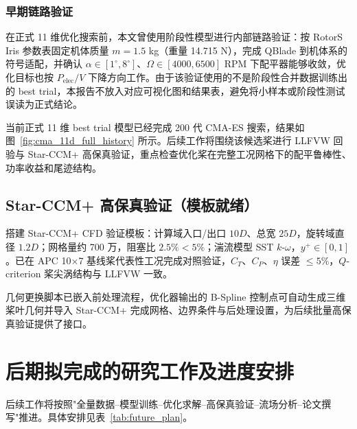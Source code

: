 \subsubsection{早期链路验证}

在正式 11 维优化搜索前，本文曾使用阶段性模型进行内部链路验证：按 RotorS Iris 参数表固定机体质量 $m=1.5$ kg（重量 14.715 N），完成 QBlade 到机体系的符号适配，并确认 $\alpha \in [1^\circ,8^\circ]$、$\Omega \in [4000,6500]$ RPM 下配平器能够收敛，优化目标也按 $P_\text{elec}/V$ 下降方向工作。由于该验证使用的不是阶段性合并数据训练出的 best trial，本报告不放入对应可视化图和结果表，避免将小样本或阶段性测试误读为正式结论。

当前正式 11 维 best trial 模型已经完成 200 代 CMA-ES 搜索，结果如图~\ref{fig:cma_11d_full_history} 所示。后续工作将围绕该候选桨进行 LLFVW 回验与 Star-CCM+ 高保真验证，重点检查优化桨在完整工况网格下的配平鲁棒性、功率收益和尾迹结构。

\subsection{Star-CCM+ 高保真验证（模板就绪）}

搭建 Star-CCM+ CFD 验证模板：计算域入口/出口 $10D$、总宽 $25D$，旋转域直径 $1.2D$；网格量约 700 万，阻塞比 $2.5\% < 5\%$；湍流模型 SST $k$-$\omega$，$y^+ \in [0, 1]$。已在 APC 10$\times$7 基线桨代表性工况完成对照验证，$C_T$、$C_P$、$\eta$ 误差 $\leq 5\%$，$Q$-criterion 桨尖涡结构与 LLFVW 一致。

几何更换脚本已嵌入前处理流程，优化器输出的 B-Spline 控制点可自动生成三维桨叶几何并导入 Star-CCM+ 完成网格、边界条件与后处理设置，为后续批量高保真验证提供了接口。


\section{后期拟完成的研究工作及进度安排}

后续工作将按照"全量数据--模型训练--优化求解--高保真验证--流场分析--论文撰写"推进。具体安排见表~\ref{tab:future_plan}。

